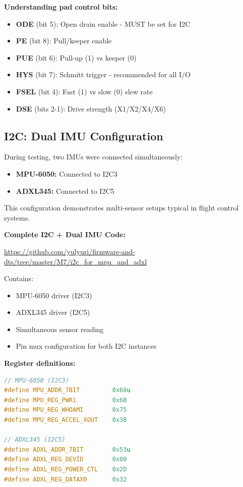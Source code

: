 \documentclass[12pt,a4paper]{report}
\begin{document}

\textbf{Understanding pad control bits:}
\begin{itemize}
    \item \textbf{ODE} (bit 5): Open drain enable - MUST be set for I2C
    \item \textbf{PE} (bit 8): Pull/keeper enable
    \item \textbf{PUE} (bit 6): Pull-up (1) vs keeper (0)
    \item \textbf{HYS} (bit 7): Schmitt trigger - recommended for all I/O
    \item \textbf{FSEL} (bit 4): Fast (1) vs slow (0) slew rate
    \item \textbf{DSE} (bits 2-1): Drive strength (X1/X2/X4/X6)
\end{itemize}

\subsection{I2C: Dual IMU Configuration}

During testing, two IMUs were connected simultaneously:
\begin{itemize}
    \item \textbf{MPU-6050:} Connected to I2C3
    \item \textbf{ADXL345:} Connected to I2C5
\end{itemize}

This configuration demonstrates multi-sensor setups typical in flight control systems.

\begin{gitref}
\textbf{Complete I2C + Dual IMU Code:}

\url{https://github.com/yulyuri/firmware-and-dts/tree/master/M7/i2c_for_mpu_and_adxl}

Contains:
\begin{itemize}
    \item MPU-6050 driver (I2C3)
    \item ADXL345 driver (I2C5)
    \item Simultaneous sensor reading
    \item Pin mux configuration for both I2C instances
\end{itemize}
\end{gitref}

\textbf{Register definitions:}
\begin{lstlisting}[language=c]
// MPU-6050 (I2C3)
#define MPU_ADDR_7BIT         0x68u
#define MPU_REG_PWR1          0x6B
#define MPU_REG_WHOAMI        0x75
#define MPU_REG_ACCEL_XOUT    0x3B

// ADXL345 (I2C5)
#define ADXL_ADDR_7BIT        0x53u
#define ADXL_REG_DEVID        0x00
#define ADXL_REG_POWER_CTL    0x2D
#define ADXL_REG_DATAX0       0x32
\end{lstlisting}
\end{document}
